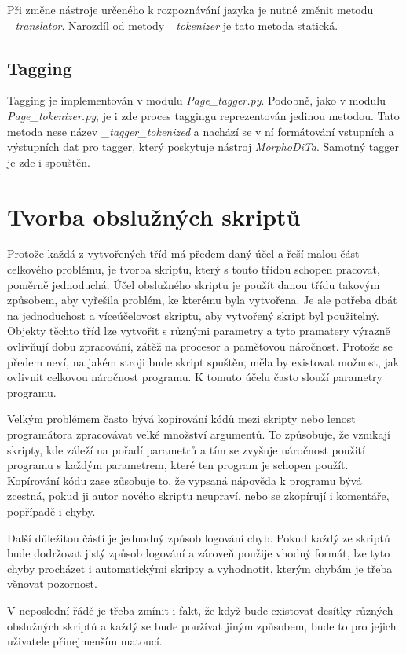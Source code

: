 Při změne nástroje určeného k rozpoznávání jazyka je nutné změnit metodu \textit{\_translator}.
Narozdíl od metody \textit{\_tokenizer} je tato metoda statická.

\subsection{Tagging}
Tagging je implementován v modulu \textit{Page\_tagger.py}. Podobně, jako v modulu
\textit{Page\_tokenizer.py}, je i zde proces taggingu reprezentován jedinou metodou.
Tato metoda nese název \textit{\_tagger\_tokenized} a nachází se v ní formátování
vstupních a výstupních dat pro tagger, který poskytuje nástroj \textit{MorphoDiTa}.
Samotný tagger je zde i spouštěn.

\section{Tvorba obslužných skriptů}
Protože každá z vytvořených tříd má předem daný účel a řeší malou část celkového problému,
je tvorba skriptu, který s touto třídou schopen pracovat, poměrně jednoduchá. Účel obslužného skriptu
je použít danou třídu takovým způsobem, aby vyřešila problém, ke kterému byla vytvořena. Je ale
potřeba dbát na jednoduchost a víceúčelovost skriptu, aby vytvořený skript byl použitelný. Objekty
těchto tříd lze vytvořit s různými parametry a tyto pramatery výrazně ovlivňují dobu zpracování,
zátěž na procesor a paměťovou náročnost. Protože se předem neví, na jakém stroji bude skript spuštěn,
měla by existovat možnost, jak ovlivnit celkovou náročnost programu. K tomuto účelu často slouží
parametry programu.

Velkým problémem často bývá kopírování kódů mezi skripty nebo lenost programátora zpracovávat
velké množství argumentů. To způsobuje, že vznikají skripty, kde záleží na pořadí parametrů
a tím se zvyšuje náročnost použití programu s každým parametrem, které ten program je schopen
použít. Kopírování kódu zase zůsobuje to, že vypsaná nápověda k programu bývá zcestná, pokud
ji autor nového skriptu neupraví, nebo se zkopírují i komentáře, popřípadě i chyby.

Další důležitou částí je jednodný způsob logování chyb. Pokud každý ze skriptů bude dodržovat
jistý způsob logování a zároveň použije vhodný formát, lze tyto chyby procházet i automatickými
skripty a vyhodnotit, kterým chybám je třeba věnovat pozornost.

V neposlední řádě je třeba zmínit i fakt, že když bude existovat desítky různých obslužných skriptů
a každý se bude používat jiným způsobem, bude to pro jejich uživatele přinejmenším matoucí.

